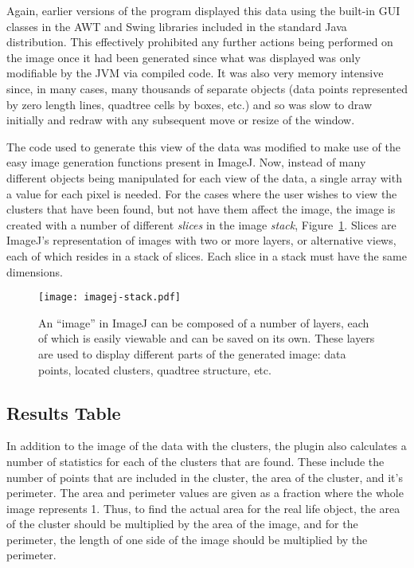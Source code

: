 Again, earlier versions of the program displayed this data using the built-in
GUI classes in the AWT\cite{zukowski1997java} and Swing\cite{loy2002java}
libraries included in the standard Java distribution. This effectively
prohibited any further actions being performed on the image once it had been
generated since what was displayed was only modifiable by the JVM via compiled
code. It was also very memory intensive since, in many cases, many thousands of
separate objects (data points represented by zero length lines, quadtree cells
by boxes, etc.) and so was slow to draw initially and redraw with any
subsequent move or resize of the window.

The code used to generate this view of the data was modified to make use of the
easy image generation functions present in ImageJ. Now, instead of many
different objects being manipulated for each view of the data, a single array
with a value for each pixel is needed. For the cases where the user wishes to
view the clusters that have been found, but not have them affect the image, the
image is created with a number of different \emph{slices} in the image
\emph{stack}, Figure~\ref{fig:imagej-stack}. Slices are ImageJ's representation
of images with two or more layers, or alternative views, each of which resides
in a stack of slices. Each slice in a stack must have the same dimensions.

\begin{figure}[tbhp]
	\centering
	\texttt{[image: imagej-stack.pdf]}

	\caption[Layers in ImageJ image representation.]{An ``image'' in ImageJ can
		be composed of a number of layers, each of which is easily viewable and
		can be saved on its own. These layers are used to display different
		parts of the generated image: data points, located clusters, quadtree
		structure, etc.}\label{fig:imagej-stack}
\end{figure}

\subsection{Results Table}
\label{sub:results_table}

In addition to the image of the data with the clusters, the plugin also
calculates a number of statistics for each of the clusters that are found.
These include the number of points that are included in the cluster, the area
of the cluster, and it's perimeter. The area and perimeter values are given as
a fraction where the whole image represents 1. Thus, to find the actual area
for the real life object, the area of the cluster should be multiplied by the
area of the image, and for the perimeter, the length of one side of the image
should be multiplied by the perimeter.

